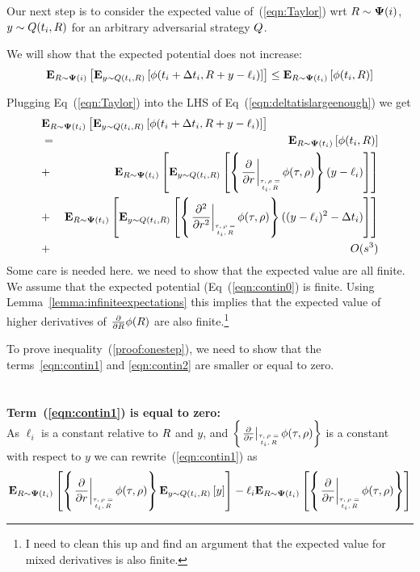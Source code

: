 \documentclass{article}[12pt]
\begin{document}
{Our next step is to consider the expected value of~(\ref{eqn:Taylor}) wrt $R \sim {\bf \Psi}(i)$,
$y \sim Q(t_i,R)$ for an arbitrary adversarial strategy
$Q$.

We will show that the expected potential does not increase:
\begin{equation} \label{eqn:deltatislargeenough}
     {\bf E}_{R \sim {\bf \Psi}(i)}\left[  {\bf E}_{y \sim Q(t_i,R)}\left[ \phi(t_i+\Delta t_i,R+y-\ell_i) \right] \right] \leq {\bf E}_{R \sim {\bf \Psi}(t_i)}\left[ \phi(t_i,R) \right]
\end{equation}

Plugging Eq~(\ref{eqn:Taylor}) into the LHS of
Eq~(\ref{eqn:deltatislargeenough}) we get
\begin{eqnarray}
  \lefteqn{\E{\R \sim \state(t_i)}{\E{y \sim \adversM(t_i,\R)}{\pot(t_i+\deltat_i,\R+y-\ell_i)}}} \\
  &=& \E{\R \sim \state(t_i)}{\pot(t_i,\R)} \label{eqn:contin0}\\
  &+& \E{\R \sim \state(t_i)}{\E{y \sim \adversM(t_i,\R)}{\at{\frac{\partial}{\partial r}} (y-\ell_i)}} \label{eqn:contin1}\\
  &+& \E{\R \sim \state(t_i)}{\E{y \sim
      \adversM(t_i,\R)}{\at{\frac{\partial^2}{\partial r^2}}
      ((y-\ell_i)^2 - \deltat_i)}}
  \label{eqn:contin2}\\
  &+& O(s^3) \label{eqn:contin3}
\end{eqnarray}
Some care is needed here. we need to show that the expected value
are all finite. We assume that the expected potential
(Eq~(\ref{eqn:contin0}) is finite. Using
Lemma~\ref{lemma:infiniteexpectations} this implies that the expected
value of higher derivatives of $\frac{\partial}{\partial R} \phi(R)$
are also finite.\footnote{I need to clean this up and find an argument
  that the expected value for mixed derivatives is also finite.}


To prove inequality~(\ref{proof:onestep}), we need to show that the
terms~\ref{eqn:contin1} and \ref{eqn:contin2} are smaller or equal to
zero.
~\\~\\~\\
{\bf Term~(\ref{eqn:contin1}) is equal to zero:}\\
As $\ell_i$ is a constant
relative to $R$ and $y$, and $\at{\frac{\partial}{\partial r}}$ is a
constant with respect to $y$ we can rewrite~(\ref{eqn:contin1}) as
\begin{equation} \label{eqnterm1.1}
  \E{\R \sim \state(t_i)}{\at{\frac{\partial}{\partial r}}
    \E{y \sim \adversM(t_i,\R)}{y} }
- \ell_i \E{\R \sim \state(t_i)}{\at{\frac{\partial}{\partial r}}}
\end{equation}

}
\end{document}
